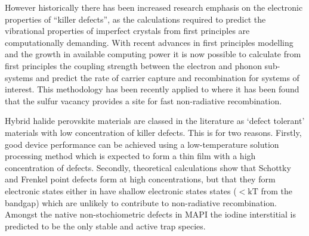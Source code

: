 However historically there has been increased research emphasis on the electronic properties of ``killer defects'', as the calculations required to predict the vibrational properties of imperfect crystals from first principles are computationally demanding.
With recent advances in first principles modelling \cite{Alkauskas2014}%
and the growth in available computing power\cite{}
it is now possible to calculate from first principles the coupling strength between the electron and phonon sub-systems and predict the rate of carrier capture and recombination for systems of interest. 
This methodology has been recently applied to  where it has been found that the sulfur vacancy provides a site for fast non-radiative recombination.

Hybrid halide perovskite materials are classed in the literature as `defect tolerant' materials with low concentration of killer defects. This is for two reasons. 
Firstly, good device performance can be achieved using a low-temperature solution processing method which is expected to form a thin film with a high concentration of defects. 
Secondly, theoretical calculations show that Schottky and Frenkel point defects form at high concentrations, but that they form electronic states either in have shallow electronic states states ($< \mathrm{kT}$ from the bandgap) which are unlikely to contribute to non-radiative recombination.
Amongst the native non-stochiometric defects in MAPI the iodine interstitial is predicted to be the only stable and active trap species.



